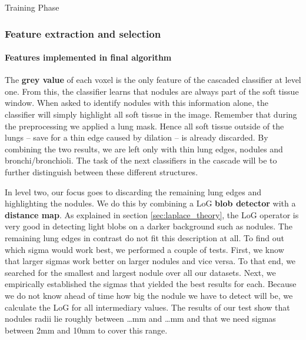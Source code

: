 \begin{algorithm}[htp]
	\DontPrintSemicolon
	\caption{Training Phase\label{alg:train}}
\end{algorithm}

\subsubsection{Feature extraction and selection} \label{sec:featureExtraction}
\paragraph{Features implemented in final algorithm}
The \textbf{grey value} of each voxel is the only feature of the cascaded
classifier at level one. From this, the classifier learns that nodules are
always part of the soft tissue window. When asked to identify nodules with this
information alone, the classifier will simply highlight all soft tissue in the
image. Remember that during the preprocessing we applied a lung mask. Hence all
soft tissue outside of the lungs -- save for a thin edge caused by dilation --
is already discarded. By combining the two results, we are left only with thin
lung edges, nodules and bronchi/bronchioli. The task of the next classifiers in
the cascade will be to further distinguish between these different structures.

In level two, our focus goes to discarding the remaining lung edges and
highlighting the nodules. We do this by combining a LoG \textbf{blob detector}
with a \textbf{distance map}. As explained in section \ref{sec:laplace_theory},
the LoG operator is very good in detecting light blobs on a darker background
such as nodules. The remaining lung edges in contrast do not fit this
description at all. To find out which sigma would work best, we performed a
couple of tests. First, we know that larger sigmas work better on larger nodules
and vice versa. To that end, we searched for the smallest and largest nodule
over all our datasets. Next, we empirically established the sigmas that yielded
the best results for each. Because we do not know ahead of time how big the
nodule we have to detect will be, we calculate the LoG for all intermediary
values. The results of our test show that nodules radii lie roughly between
\ldots mm and \ldots mm and that we need sigmas between 2mm and 10mm to cover
this range.

